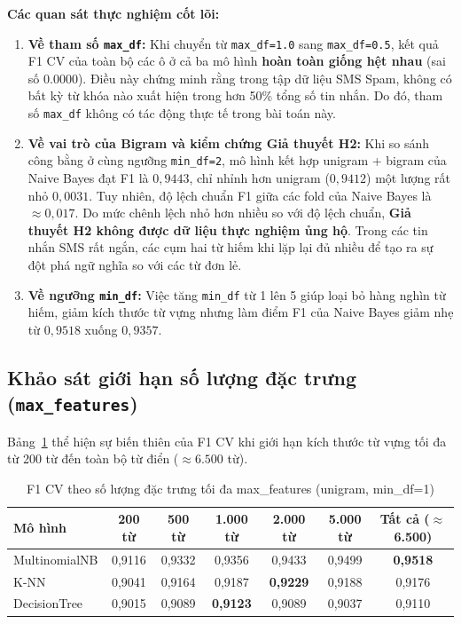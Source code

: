 \textbf{Các quan sát thực nghiệm cốt lõi:}
\begin{enumerate}
    \item \textbf{Về tham số \texttt{max\_df}:} Khi chuyển từ \texttt{max\_df=1.0} sang \texttt{max\_df=0.5}, kết quả F1 CV của toàn bộ các ô ở cả ba mô hình \textbf{hoàn toàn giống hệt nhau} (sai số $0.0000$). Điều này chứng minh rằng trong tập dữ liệu SMS Spam, không có bất kỳ từ khóa nào xuất hiện trong hơn 50\% tổng số tin nhắn. Do đó, tham số \texttt{max\_df} không có tác động thực tế trong bài toán này.
    \item \textbf{Về vai trò của Bigram và kiểm chứng Giả thuyết H2:} Khi so sánh công bằng ở cùng ngưỡng \texttt{min\_df=2}, mô hình kết hợp unigram + bigram của Naive Bayes đạt F1 là $0,9443$, chỉ nhỉnh hơn unigram ($0,9412$) một lượng rất nhỏ $0,0031$. Tuy nhiên, độ lệch chuẩn F1 giữa các fold của Naive Bayes là $\approx 0,017$. Do mức chênh lệch nhỏ hơn nhiều so với độ lệch chuẩn, \textbf{Giả thuyết H2 không được dữ liệu thực nghiệm ủng hộ}. Trong các tin nhắn SMS rất ngắn, các cụm hai từ hiếm khi lặp lại đủ nhiều để tạo ra sự đột phá ngữ nghĩa so với các từ đơn lẻ.
    \item \textbf{Về ngưỡng \texttt{min\_df}:} Việc tăng \texttt{min\_df} từ 1 lên 5 giúp loại bỏ hàng nghìn từ hiếm, giảm kích thước từ vựng nhưng làm điểm F1 của Naive Bayes giảm nhẹ từ $0,9518$ xuống $0,9357$.
\end{enumerate}

\subsection{Khảo sát giới hạn số lượng đặc trưng (\texttt{max\_features})}
Bảng~\ref{tab:max-features-study} thể hiện sự biến thiên của F1 CV khi giới hạn kích thước từ vựng tối đa từ 200 từ đến toàn bộ từ điển ($\approx 6.500$ từ).

\begin{table}[H]
\centering
\caption{F1 CV theo số lượng đặc trưng tối đa max\_features (unigram, min\_df=1)}
\label{tab:max-features-study}
\begin{tabular}{|l|c|c|c|c|c|c|}
\hline
\textbf{Mô hình} & \textbf{200 từ} & \textbf{500 từ} & \textbf{1.000 từ} & \textbf{2.000 từ} & \textbf{5.000 từ} & \textbf{Tất cả ($\approx$6.500)} \\
\hline
MultinomialNB & 0,9116 & 0,9332 & 0,9356 & 0,9433 & 0,9499 & \textbf{0,9518} \\
\hline
K-NN & 0,9041 & 0,9164 & 0,9187 & \textbf{0,9229} & 0,9188 & 0,9176 \\
\hline
DecisionTree & 0,9015 & 0,9089 & \textbf{0,9123} & 0,9089 & 0,9037 & 0,9110 \\
\hline
\end{tabular}
\end{table}


